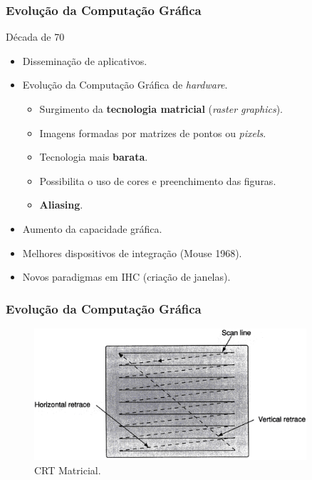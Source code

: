 \documentclass{beamer}
\begin{document}


\begin{frame}
\frametitle{Evolução da Computação Gráfica}

\begin{block}{Década de 70}
		\begin{itemize}
			\item<1-> Disseminação de aplicativos.
			\item<1-> Evolução da Computação Gráfica de \textit{hardware}.
				\begin{itemize}
					\item Surgimento da \textbf{tecnologia matricial} (\textit{raster graphics}).
					\item Imagens formadas por matrizes de pontos ou \textit{pixels}.
					\item Tecnologia mais \textbf{barata}.
					\item Possibilita o uso de cores e preenchimento das figuras.
					\item \textbf{Aliasing}.
				\end{itemize}
			\item Aumento da capacidade gráfica.
			\item Melhores dispositivos de integração (Mouse 1968).
			\item Novos paradigmas em IHC (criação de janelas).
		\end{itemize}
\end{block}

\end{frame}




\begin{frame}
\frametitle{Evolução da Computação Gráfica}

	\begin{figure}[!h]
		\begin{center}
			\includegraphics[width=0.9\textwidth]{Figures/matrixcrt}
			\caption{CRT Matricial.}
		\end{center}
		
	\end{figure}

\end{frame}
\end{document}
